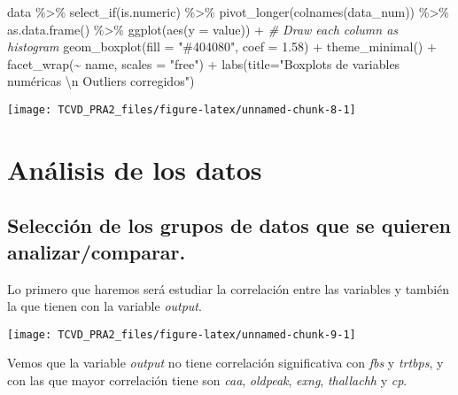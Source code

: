 \documentclass[
]{article}
\newenvironment{Shaded}{\begin{snugshade}}{\end{snugshade}}
\newcommand{\AttributeTok}[1]{\textcolor[rgb]{0.77,0.63,0.00}{#1}}
\newcommand{\CommentTok}[1]{\textcolor[rgb]{0.56,0.35,0.01}{\textit{#1}}}
\newcommand{\FloatTok}[1]{\textcolor[rgb]{0.00,0.00,0.81}{#1}}
\newcommand{\FunctionTok}[1]{\textcolor[rgb]{0.00,0.00,0.00}{#1}}
\newcommand{\NormalTok}[1]{#1}
\newcommand{\SpecialCharTok}[1]{\textcolor[rgb]{0.00,0.00,0.00}{#1}}
\newcommand{\StringTok}[1]{\textcolor[rgb]{0.31,0.60,0.02}{#1}}
\begin{document}
\begin{Shaded}
\begin{Highlighting}[]
\NormalTok{data }\SpecialCharTok{\%\textgreater{}\%} 
  \FunctionTok{select\_if}\NormalTok{(is.numeric) }\SpecialCharTok{\%\textgreater{}\%} 
\FunctionTok{pivot\_longer}\NormalTok{(}\FunctionTok{colnames}\NormalTok{(data\_num)) }\SpecialCharTok{\%\textgreater{}\%} 
  \FunctionTok{as.data.frame}\NormalTok{() }\SpecialCharTok{\%\textgreater{}\%} 
  \FunctionTok{ggplot}\NormalTok{(}\FunctionTok{aes}\NormalTok{(}\AttributeTok{y =}\NormalTok{ value)) }\SpecialCharTok{+}    \CommentTok{\# Draw each column as histogram}
  \FunctionTok{geom\_boxplot}\NormalTok{(}\AttributeTok{fill =} \StringTok{"\#404080"}\NormalTok{, }\AttributeTok{coef =} \FloatTok{1.58}\NormalTok{) }\SpecialCharTok{+} 
  \FunctionTok{theme\_minimal}\NormalTok{() }\SpecialCharTok{+}
  \FunctionTok{facet\_wrap}\NormalTok{(}\SpecialCharTok{\textasciitilde{}}\NormalTok{ name, }\AttributeTok{scales =} \StringTok{"free"}\NormalTok{) }\SpecialCharTok{+}
  \FunctionTok{labs}\NormalTok{(}\AttributeTok{title=}\StringTok{"Boxplots de variables numéricas }\SpecialCharTok{\textbackslash{}n}\StringTok{ Outliers corregidos"}\NormalTok{)}
\end{Highlighting}
\end{Shaded}

\begin{center}\texttt{[image: TCVD\_PRA2\_files/figure-latex/unnamed-chunk-8-1]} \end{center}

\hypertarget{anuxe1lisis-de-los-datos}{%
\section{Análisis de los datos}\label{anuxe1lisis-de-los-datos}}

\hypertarget{selecciuxf3n-de-los-grupos-de-datos-que-se-quieren-analizarcomparar.}{%
\subsection{Selección de los grupos de datos que se quieren
analizar/comparar.}\label{selecciuxf3n-de-los-grupos-de-datos-que-se-quieren-analizarcomparar.}}

Lo primero que haremos será estudiar la correlación entre las variables
y también la que tienen con la variable \emph{output}.

\begin{center}\texttt{[image: TCVD\_PRA2\_files/figure-latex/unnamed-chunk-9-1]} \end{center}

Vemos que la variable \emph{output} no tiene correlación significativa
con \emph{fbs} y \emph{trtbps}, y con las que mayor correlación tiene
son \emph{caa}, \emph{oldpeak}, \emph{exng}, \emph{thallachh} y
\emph{cp}.
\end{document}
